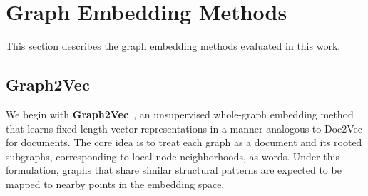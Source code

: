 \section{Graph Embedding Methods}




This section describes the graph embedding methods evaluated in this work.%
\subsection{Graph2Vec}
We begin with \textbf{Graph2Vec}~\cite{narayanangraph2vec}, an unsupervised whole-graph embedding method that learns 
fixed-length vector representations in a manner analogous to Doc2Vec for documents. 
The core idea is to treat each graph as a document and its rooted subgraphs, corresponding to local node neighborhoods, as words. 
Under this formulation, graphs that share similar structural patterns are expected to be mapped to nearby points in the embedding space.




